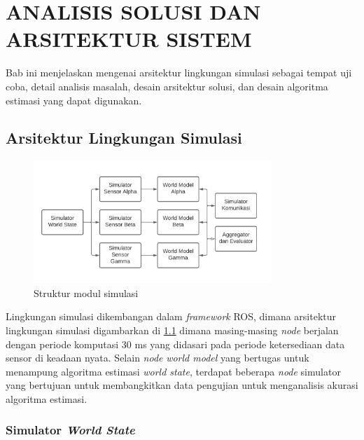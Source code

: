 \chapter{ANALISIS SOLUSI DAN ARSITEKTUR SISTEM}

Bab ini menjelaskan mengenai arsitektur lingkungan simulasi sebagai tempat uji coba, detail analisis masalah, desain arsitektur solusi, dan desain algoritma estimasi yang dapat digunakan.

\section{Arsitektur Lingkungan Simulasi}

\begin{figure}[h]
    \centering
    \medskip
    \includegraphics[width=0.8\textwidth]{resources/simulation-structure.png}
    \caption{Struktur modul simulasi}
    \label{fig:simulation-structure}
    \bigskip
\end{figure}

Lingkungan simulasi dikembangan dalam \textit{framework} ROS, dimana arsitektur lingkungan simulasi digambarkan di \ref{fig:simulation-structure} dimana masing-masing \textit{node} berjalan dengan periode komputasi $30$ ms yang didasari pada periode ketersediaan data sensor di keadaan nyata. Selain \textit{node} \textit{world model} yang bertugas untuk menampung algoritma estimasi \textit{world state}, terdapat beberapa \textit{node} simulator yang bertujuan untuk membangkitkan data pengujian untuk menganalisis akurasi algoritma estimasi.

\subsection{Simulator \textit{World State}}

